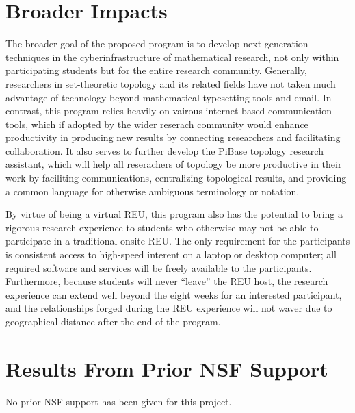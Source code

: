 \section{Broader Impacts}

  The broader goal of the proposed program is to develop next-generation
  techniques in the cyberinfrastructure of mathematical research,
  not only within participating students but for the entire research
  community. Generally, researchers in set-theoretic topology
  and its related fields have not
  taken much advantage of technology beyond mathematical typesetting tools
  and email. In contrast, this program relies heavily on vairous internet-based
  communication tools, which if adopted by the wider
  reserach community would enhance productivity in producing new results
  by connecting researchers and facilitating collaboration. It also serves to
  further develop the PiBase topology research assistant, which will help all
  reserachers of topology be more productive in their work by faciliting
  communications, centralizing topological results, and providing a common
  language for otherwise ambiguous terminology or notation.

  By virtue of being a virtual REU, this program also has the potential to
  bring a rigorous research experience to students who otherwise may not
  be able to participate in a traditional onsite REU. The only requirement
  for the participants is consistent access to high-speed interent on a
  laptop or desktop computer; all required software and services will
  be freely available to the participants. Furthermore, because students
  will never ``leave'' the REU host, the research experience can extend
  well beyond the eight weeks for an interested participant, and the
  relationships forged during the REU experience will not waver due to
  geographical distance after the end of the program.

\section{Results From Prior NSF Support}

  No prior NSF support has been given for this project.
